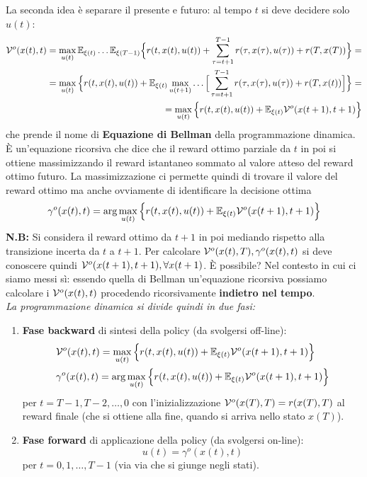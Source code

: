 La seconda idea \`e separare il presente e futuro: al tempo $t$ si deve decidere solo $u(t)$:
\begin{align}
\mathcal{V}^o(x(t), t) = \max_{u(t)} \mathbb{E}_{\xi(t)} \dots \mathbb{E}_{\xi(T-1)} \Big \{ r(t, x(t), u(t)) + \sum_{\tau=t+1}^{T-1} r(\tau, x(\tau), u(\tau)) + r(T, x(T)) \Big \} = \\
= \max_{u(t)} \Big \{ r(t, x(t), u(t)) + \mathbb{E}_{\xi(t)} \max_{u(t+1)} \dots \Big [ \sum_{\tau=t+1}^{T-1} r(\tau, x(\tau), u(\tau)) + r(T, x(t)) \Big ] \Big \} = \\
= \max_{u(t)} \Big \{ r(t, x(t), u(t)) + \mathbb{E}_{\xi(t)} \mathcal{V}^o(x(t+1),t+1) \Big \}
\end{align} che prende il nome di \textbf{Equazione di Bellman} della programmazione dinamica. \`E un'equazione ricorsiva che dice che il reward ottimo parziale da $t$ in poi si ottiene massimizzando il reward istantaneo sommato al valore atteso del reward ottimo futuro. La massimizzazione ci permette quindi di trovare il valore del reward ottimo ma anche ovviamente di identificare la decisione ottima
\begin{equation}
\gamma^o (x(t), t) = \arg \max_{u(t)} \Big \{ r(t, x(t), u(t)) + \mathbb{E}_{\xi(t)} \mathcal{V}^o (x(t+1), t+1) \Big \}
\end{equation} \textbf{N.B:} Si considera il reward ottimo da $t+1$ in poi mediando rispetto alla transizione incerta da $t$ a $t+1$.
Per calcolare $\mathcal{V}^o(x(t), T), \gamma^o(x(t),t)$ si deve conoscere quindi $\mathcal{V}^o(x(t+1),t+1), \forall x(t+1)$. \`E possibile? Nel contesto in cui ci siamo messi s\`i: essendo quella di Bellman un'equazione ricorsiva possiamo calcolare i $\mathcal{V}^o(x(t),t)$ procedendo ricorsivamente \textbf{indietro nel tempo}. \\
\textit{La programmazione dinamica si divide quindi in due fasi:}
\begin{enumerate}
\item \textbf{Fase backward} di sintesi della policy (da svolgersi off-line):
  \begin{align}
    &\mathcal{V}^o(x(t), t) = \max_{u(t)} \Big \{ r(t, x(t), u(t)) + \mathbb{E}_{\xi(t)} \mathcal{V}^o(x(t+1),t+1) \Big \} \\
    &\gamma^o (x(t), t) = \arg \max_{u(t)} \Big \{ r(t, x(t), u(t)) + \mathbb{E}_{\xi(t)} \mathcal{V}^o (x(t+1), t+1) \Big \}
  \end{align} per $t=T-1, T-2, \dots, 0$ con l'inizializzazione $\mathcal{V}^o(x(T),T) = r(x(T), T)$ al reward finale (che si ottiene alla fine, quando si arriva nello stato $x(T)$).
\item \textbf{Fase forward} di applicazione della policy (da svolgersi on-line):
  \begin{equation}
    u(t) = \gamma^o(x(t), t)
  \end{equation} per $t=0, 1, \dots, T-1$ (via via che si giunge negli stati).
\end{enumerate}
